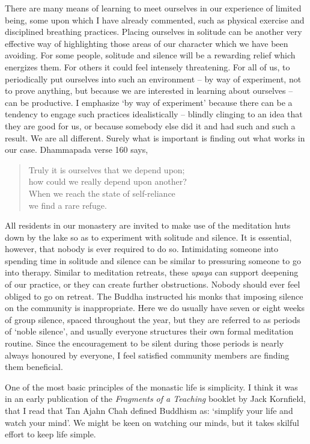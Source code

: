 There are many means of learning to meet ourselves in our experience of
limited being, some upon which I have already commented, such as
physical exercise and disciplined breathing practices. Placing ourselves
in solitude can be another very effective way of highlighting those
areas of our character which we have been avoiding. For some people,
solitude and silence will be a rewarding relief which energizes them.
For others it could feel intensely threatening. For all of us, to
periodically put ourselves into such an environment -- by way of
experiment, not to prove anything, but because we are interested in
learning about ourselves -- can be productive. I emphasize `by way of
experiment' because there can be a tendency to engage such practices
idealistically -- blindly clinging to an idea that they are good for us,
or because somebody else did it and had such and such a result. We are
all different. Surely what is important is finding out what works in our
case. Dhammapada verse 160 says,

\clearpage

\begin{quote}
  Truly it is ourselves that we depend upon;\\
  how could we really depend upon another?\\
  When we reach the state of self-reliance\\
  we find a rare refuge.
\end{quote}

All residents in our monastery are invited to make use of the meditation
huts down by the lake so as to experiment with solitude and silence. It
is essential, however, that nobody is ever required to do so.
Intimidating someone into spending time in solitude and silence can be
similar to pressuring someone to go into therapy. Similar to meditation
retreats, these \emph{upaya} can support deepening of our practice, or
they can create further obstructions. Nobody should ever feel obliged to
go on retreat. The Buddha instructed his monks that imposing silence on
the community is inappropriate. Here we do usually have seven or eight
weeks of group silence, spaced throughout the year, but they are
referred to as periods of `noble silence', and usually everyone
structures their own formal meditation routine. Since the encouragement
to be silent during those periods is nearly always honoured by everyone,
I feel satisfied community members are finding them beneficial.

One of the most basic principles of the monastic life is simplicity. I
think it was in an early publication of the \emph{Fragments of a Teaching}\cite{collected}
booklet by Jack Kornfield, that I read that
Tan Ajahn Chah defined Buddhism as: `simplify your life and watch your
mind'. We might be keen on watching our minds, but it takes skilful
effort to keep life simple.

